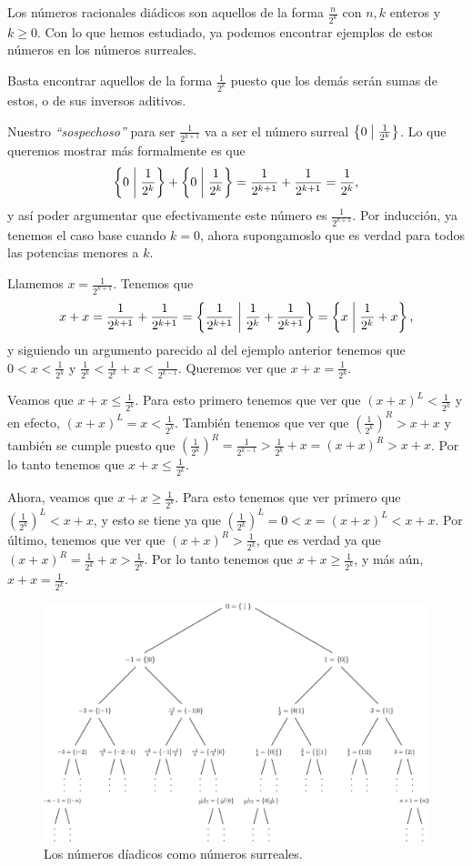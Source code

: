     \begin{example}
        \label{Ex_num_diadicos}
        Los n\'umeros racionales di\'adicos son aquellos de la forma $\frac{n}{2^k}$ con $n, k$ enteros y $k \ge 0$. Con lo que hemos estudiado, ya podemos encontrar ejemplos de estos n\'umeros en los n\'umeros surreales.

        Basta encontrar aquellos de la forma $\frac{1}{2^k}$ puesto que los dem\'as ser\'an sumas de estos, o de sus inversos aditivos.

        Nuestro \textit{``sospechoso''} para ser $\frac{1}{2^{k+1}}$ va a ser el n\'umero surreal $\left\{0\;\middle|\; \frac{1}{2^k}\right\}$. Lo que queremos mostrar m\'as formalmente es que 
        \[
            \left\{0\;\middle|\; \frac{1}{2^{k}}\right\} + \left\{0\;\middle|\; \frac{1}{2^{k}}\right\} = \frac{1}{2^{k+1}} + \frac{1}{2^{k+1}} = \frac{1}{2^k},
        \]
        y as\'i poder argumentar que efectivamente este n\'umero es $\frac{1}{2^{k+1}}$. Por inducci\'on, ya tenemos el caso base cuando $k=0$, ahora supongamoslo que es verdad para todos las potencias menores a $k$.

        Llamemos $x = \frac{1}{2^{k+1}}$. Tenemos que
        \[
            x + x = \frac{1}{2^{k+1}} + \frac{1}{2^{k+1}} = \left\{\frac{1}{2^{k+1}}\;\middle|\; \frac{1}{2^{k}} +\frac{1}{2^{k+1}}\right\} = \left\{x\;\middle|\; \frac{1}{2^k} + x\right\},
        \]
        y siguiendo un argumento parecido al del ejemplo anterior tenemos que $0 < x < \frac{1}{2^k}$ y $\frac{1}{2^k} < \frac{1}{2^k} + x < \frac{1}{2^{k-1}}$. Queremos ver que $x+x = \frac{1}{2^{k}}$.

        Veamos que $x+x\le \frac{1}{2^k}$. Para esto primero tenemos que ver que $(x+x)^L < \frac{1}{2^k}$ y en efecto, $(x+x)^L = x < \frac{1}{2^k}$. Tambi\'en tenemos que ver que $(\frac{1}{2^k})^R > x+x$ y tambi\'en se cumple puesto que $(\frac{1}{2^k})^R = \frac{1}{2^{k-1}} > \frac{1}{2^k} + x = (x+x)^R > x+x$. Por lo tanto tenemos que $x+x\le \frac{1}{2^k}$.

        Ahora, veamos que $x+x\ge \frac{1}{2^k}$. Para esto tenemos que ver primero que $(\frac{1}{2^k})^L < x+x$, y esto se tiene ya que $(\frac{1}{2^k})^L = 0 < x = (x+x)^L < x+x$. Por \'ultimo, tenemos que ver que $(x+x)^R > \frac{1}{2^k}$, que es verdad ya que $(x+x)^R = \frac{1}{2^k} + x > \frac{1}{2^k}$. Por lo tanto tenemos que $x+x\ge \frac{1}{2^k}$, y m\'as a\'un, $x+x = \frac{1}{2^k}$.

    \end{example}


    \begin{figure}
        \centering
        \includegraphics[width=\textwidth]{images/surreal-finite.pdf}
        \caption{Los n\'umeros d\'iadicos como n\'umeros surreales.}
        \label{figure:surreal-finite}
    \end{figure}